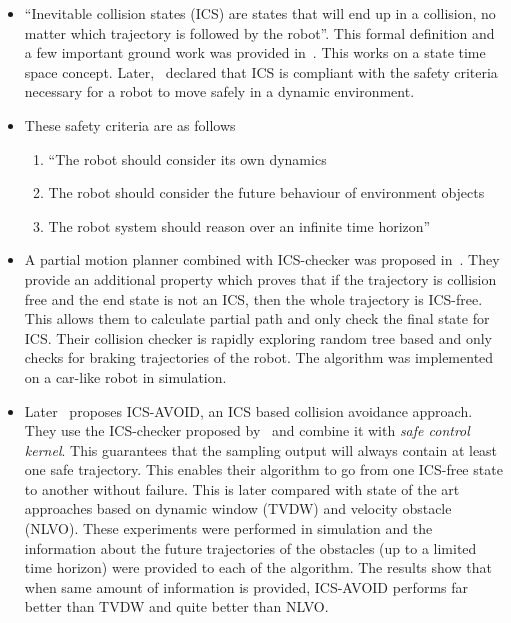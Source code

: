 \begin{itemize}
    \item ``Inevitable collision states (ICS) are states that will end up in a collision, no matter which trajectory is followed by the robot''\cite{fraichard2004inevitable}. This formal definition and a few important ground work was provided in~\cite{fraichard2004inevitable}. This works on a state time space concept. Later,~\cite{fraichard2007short} declared that ICS is compliant with the safety criteria necessary for a robot to move safely in a dynamic environment. 
\item These safety criteria are as follows
    \begin{enumerate}
        \item ``The robot should consider its own dynamics
        \item The robot should consider the future behaviour of environment objects
        \item The robot system should reason over an infinite time horizon''\cite{fraichard2007short}
    \end{enumerate}
\item A partial motion planner combined with ICS-checker was proposed in~\cite{petti2005safe}. They provide an additional property which proves that if the trajectory is collision free and the end state is not an ICS, then the whole trajectory is ICS-free. This allows them to calculate partial path and only check the final state for ICS\@. Their collision checker is rapidly exploring random tree based and only checks for braking trajectories of the robot. The algorithm was implemented on a car-like robot in simulation.
\item Later~\cite{martinez2009collision} proposes ICS-AVOID, an ICS based collision avoidance approach. They use the ICS-checker proposed by~\cite{martinez2008efficient} and combine it with \textit{safe control kernel}. This guarantees that the sampling output will always contain at least one safe trajectory. This enables their algorithm to go from one ICS-free state to another without failure. This is later compared with state of the art approaches based on dynamic window (TVDW\cite{seder2007dynamic}) and velocity obstacle (NLVO\cite{large2005navigation}). These experiments were performed in simulation and the information about the future trajectories of the obstacles (up to a limited time horizon) were provided to each of the algorithm. The results show that when same amount of information is provided, ICS-AVOID performs far better than TVDW and quite better than NLVO\@.

\end{itemize}
